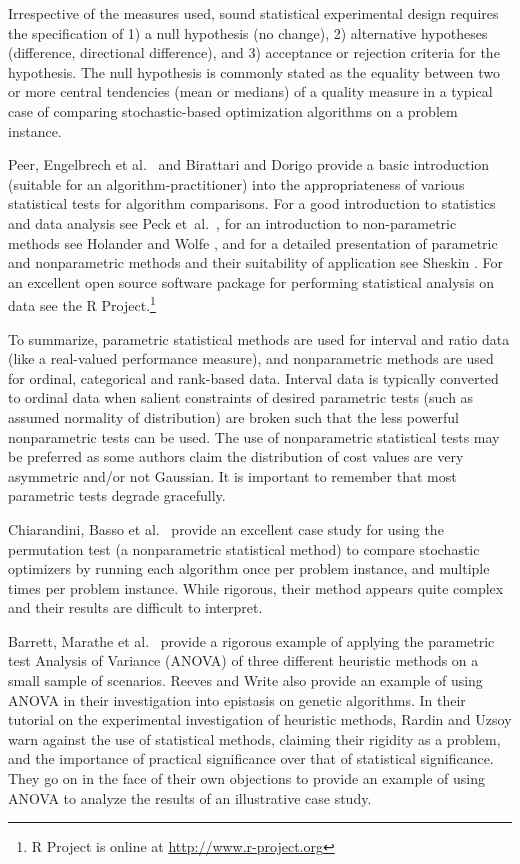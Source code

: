 Irrespective of the measures used, sound statistical experimental design requires the specification of 1) a null hypothesis (no change), 2) alternative hypotheses (difference, directional difference), and 3) acceptance or rejection criteria for the hypothesis. The null hypothesis is commonly stated as the equality between two or more central tendencies (mean or medians) of a quality measure in a typical case	of comparing stochastic-based optimization algorithms on a problem instance.

Peer, Engelbrech et al.\ \cite{Peer2003} and Birattari and Dorigo \cite{Birattari2005a} provide a basic introduction (suitable for an algorithm-practitioner) into the appropriateness of various statistical tests for algorithm comparisons. For a good introduction to statistics and data analysis see Peck et~al.\ \cite{Peck2005}, for an introduction to non-parametric methods see Holander and Wolfe \cite{Hollander1999}, and for a detailed presentation of parametric and nonparametric methods and their suitability of application see Sheskin \cite{Hughes2006}. For an excellent open source software package for performing statistical analysis on data see the R Project.\footnote{R Project is online at \url{http://www.r-project.org}}

To summarize, parametric statistical methods are used for interval and ratio data (like a real-valued performance measure), and nonparametric methods are used for ordinal, categorical and rank-based data. Interval data is typically converted to ordinal data when salient constraints of desired parametric tests (such as assumed normality of distribution) are broken such that the less powerful nonparametric tests can be used. The use of nonparametric statistical tests may be preferred as some authors \cite{Peer2003, Chiarandini2005} claim the distribution of cost values are very asymmetric and/or not Gaussian. It is important to remember that most parametric tests degrade gracefully.

Chiarandini, Basso et al.\ \cite{Chiarandini2005} provide an excellent case study for using the permutation test (a nonparametric statistical method) to compare stochastic optimizers by running each algorithm once per problem instance, and multiple times per problem instance. While rigorous, their method appears quite complex and their results are difficult to interpret.

Barrett, Marathe et al.\ \cite{Barrett2003} provide a rigorous example of applying the parametric test Analysis of Variance (ANOVA) of three different heuristic methods on a small sample of scenarios. Reeves and Write \cite{Reeves1995, Reeves1995a} also provide an example of using ANOVA in their investigation into epistasis on genetic algorithms. In their tutorial on the experimental investigation of heuristic methods, Rardin and Uzsoy \cite{Rardin2001} warn against the use of statistical methods, claiming their rigidity as a problem, and the importance of practical significance over that of statistical significance. They go on in the face of their own objections to provide an example of using ANOVA to analyze the results of an illustrative case study.

